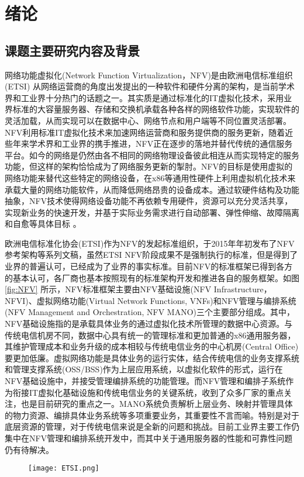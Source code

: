 \chapter{绪论}
\label{chap:Introduction}
\section{课题主要研究内容及背景}
网络功能虚拟化(Network Function Virtualization，NFV)是由欧洲电信标准组织 (ETSI) 从网络运营商的角度出发提出的一种软件和硬件分离的架构，是当前学术界和工业界十分热门的话题之一。其实质是通过标准化的IT虚拟化技术，采用业界标准的大容量服务器、存储和交换机承载各种各样的网络软件功能，实现软件的灵活加载，从而实现可以在数据中心、网络节点和用户端等不同位置灵活部署。NFV利用标准IT虚拟化技术来加速网络运营商和服务提供商的服务更新，随着近些年来学术界和工业界的携手推进，NFV正在逐步的落地并替代传统的通信服务平台。如今的网络是仍然由各不相同的网络物理设备彼此相连从而实现特定的服务功能，但这样的架构恰恰成为了网络服务更新的掣肘。NFV的目标是使用虚拟的网络功能来替代这些特定的网络设备，在x86等通用性硬件上利用虚拟机化技术来承载大量的网络功能软件，从而降低网络昂贵的设备成本。通过软硬件结构及功能抽象，NFV技术使得网络设备功能不再依赖专用硬件，资源可以充分灵活共享，实现新业务的快速开发，并基于实际业务需求进行自动部署、弹性伸缩、故障隔离和自愈等具体目标 \cite{etsi2013001}。
 
欧洲电信标准化协会(ETSI)作为NFV的发起标准组织，于2015年年初发布了NFV参考架构等系列文稿，虽然ETSI NFV阶段成果不是强制执行的标准，但是得到了业界的普遍认可，已经成为了业界的事实标准。目前NFV的标准框架已得到各方的基本认可，各厂商也基本按照现有的标准架构开发和推进各自的服务框架。如图 \ref{fig:NFV} 所示，NFV标准框架主要由NFV基础设施(NFV Infrastructure，NFVI)、虚拟网络功能(Virtual Network Functions, VNFs)和NFV管理与编排系统(NFV Management and Orchestration, NFV MANO)三个主要部分组成。其中，NFV基础设施指的是承载具体业务的通过虚拟化技术所管理的数据中心资源。与传统电信机房不同，数据中心具有统一的管理标准和更加普通的x86通用服务器，其维护管理成本和业务升级的成本相较与传统电信业务的中心机房(Central Office)要更加低廉。虚拟网络功能是具体业务的运行实体，结合传统电信的业务支撑系统和管理支撑系统(OSS/BSS)作为上层应用系统，以虚拟化软件的形式，运行在NFV基础设施中，并接受管理编排系统的功能管理。而NFV管理和编排子系统作为衔接IT虚拟化基础设施和传统电信业务的关键系统，收到了众多厂家的重点关注，也是目前研究的重点之一。MANO系统负责解析上层业务、映射并管理具体的物力资源、编排具体业务系统等多项重要业务，其重要性不言而喻。特别是对于底层资源的管理，对于传统电信来说是全新的问题和挑战。目前工业界主要工作仍集中在NFV管理和编排系统开发中，而其中关于通用服务器的性能和可靠性问题仍有待解决。
\begin{figure}[!htp]
	\centering
	\texttt{[image: ETSI.png]}
\end{figure}


